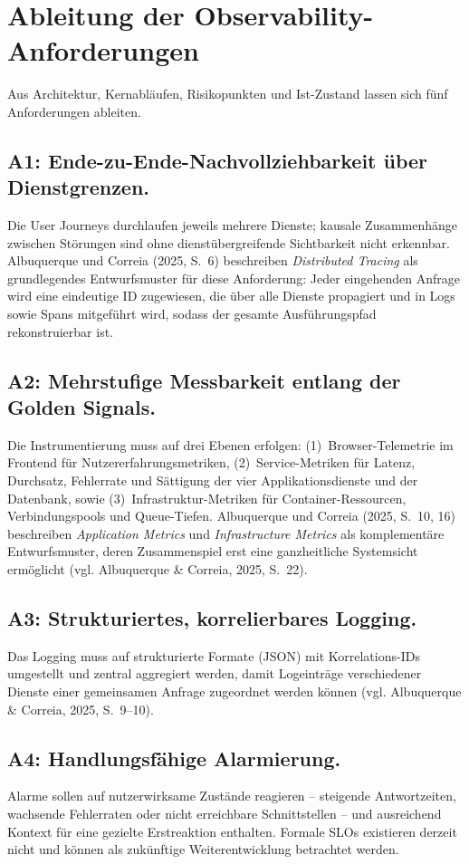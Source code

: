  
\section{Ableitung der Observability-Anforderungen}
 
Aus Architektur, Kernabläufen, Risikopunkten und Ist-Zustand lassen sich fünf Anforderungen ableiten.
 
\subsection{A1: Ende-zu-Ende-Nachvollziehbarkeit über Dienstgrenzen.}
Die User Journeys durchlaufen jeweils mehrere Dienste; kausale Zusammenhänge zwischen Störungen sind ohne dienstübergreifende Sichtbarkeit nicht erkennbar. Albuquerque und Correia (2025, S.~6) beschreiben \emph{Distributed Tracing} als grundlegendes Entwurfsmuster für diese Anforderung: Jeder eingehenden Anfrage wird eine eindeutige ID zugewiesen, die über alle Dienste propagiert und in Logs sowie Spans mitgeführt wird, sodass der gesamte Ausführungspfad rekonstruierbar ist.
 
\subsection{A2: Mehrstufige Messbarkeit entlang der Golden Signals.}
Die Instrumentierung muss auf drei Ebenen erfolgen: (1)~Browser-Telemetrie im Frontend für Nutzererfahrungsmetriken, (2)~Service-Metriken für Latenz, Durchsatz, Fehlerrate und Sättigung der vier Applikationsdienste und der Datenbank, sowie (3)~Infrastruktur-Metriken für Container-Ressourcen, Verbindungspools und Queue-Tiefen. Albuquerque und Correia (2025, S.~10, 16) beschreiben \emph{Application Metrics} und \emph{Infrastructure Metrics} als komplementäre Entwurfsmuster, deren Zusammenspiel erst eine ganzheitliche Systemsicht ermöglicht (vgl. Albuquerque \& Correia, 2025, S.~22).
 
\subsection{A3: Strukturiertes, korrelierbares Logging.}
Das Logging muss auf strukturierte Formate (JSON) mit Korrelations-IDs umgestellt und zentral aggregiert werden, damit Logeinträge verschiedener Dienste einer gemeinsamen Anfrage zugeordnet werden können (vgl. Albuquerque \& Correia, 2025, S.~9--10).
 
\subsection{A4: Handlungsfähige Alarmierung.}
Alarme sollen auf nutzerwirksame Zustände reagieren -- steigende Antwortzeiten, wachsende Fehlerraten oder nicht erreichbare Schnittstellen -- und ausreichend Kontext für eine gezielte Erstreaktion enthalten. Formale SLOs existieren derzeit nicht und können als zukünftige Weiterentwicklung betrachtet werden.
 
